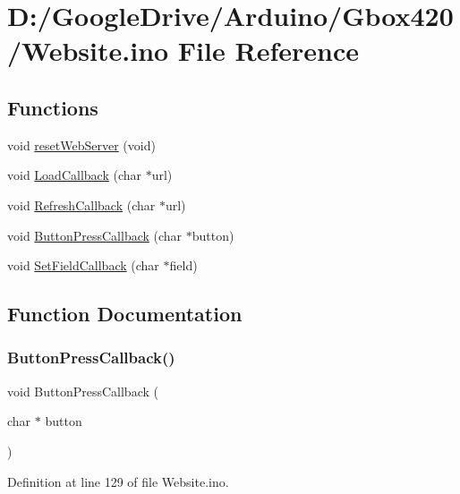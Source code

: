 \hypertarget{_website_8ino}{}\section{D\+:/\+Google\+Drive/\+Arduino/\+Gbox420/\+Website.ino File Reference}
\label{_website_8ino}
\subsection*{Functions}
\begin{DoxyCompactItemize}
\item 
void \mbox{\hyperlink{_website_8ino_af141387cf1674081eca9db00c3c869ab}{reset\+Web\+Server}} (void)
\item 
void \mbox{\hyperlink{_website_8ino_a9eb581207649c885c5e64a733761f67e}{Load\+Callback}} (char $\ast$url)
\item 
void \mbox{\hyperlink{_website_8ino_a0dc4b51f027287a3afc1aa783332505d}{Refresh\+Callback}} (char $\ast$url)
\item 
void \mbox{\hyperlink{_website_8ino_ae2ee2867457b4d945702b2fb14e158f1}{Button\+Press\+Callback}} (char $\ast$button)
\item 
void \mbox{\hyperlink{_website_8ino_a6f7efff8f677d80bc137cc399db4a31f}{Set\+Field\+Callback}} (char $\ast$field)
\end{DoxyCompactItemize}


\subsection{Function Documentation}
\mbox{\label{_website_8ino_ae2ee2867457b4d945702b2fb14e158f1}} 
\subsubsection{\texorpdfstring{ButtonPressCallback()}{ButtonPressCallback()}}
{\footnotesize\ttfamily void Button\+Press\+Callback (\begin{DoxyParamCaption}\item[{char $\ast$}]{button }\end{DoxyParamCaption})}



Definition at line 129 of file Website.\+ino.

